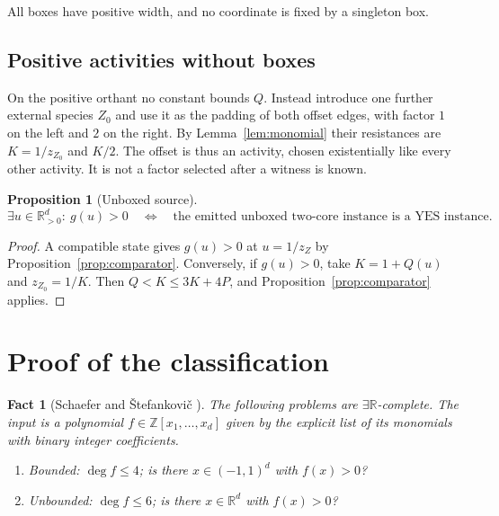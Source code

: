\documentclass[11pt,a4paper]{article}
\theoremstyle{plain}
\newtheorem{proposition}[theorem]{Proposition}
\newtheorem{fact}[theorem]{Fact}
\theoremstyle{definition}
\theoremstyle{remark}
\newcommand{\ER}{\exists\mathbb{R}}
\newcommand{\R}{\mathbb{R}}
\newcommand{\Z}{\mathbb{Z}}
\begin{document}
All boxes have positive width, and no coordinate is fixed by a singleton box.

\subsection{Positive activities without boxes}

On the positive orthant no constant bounds $Q$. Instead introduce one further external species $Z_0$ and use it as the padding of both offset edges, with factor $1$ on the left and $2$ on the right. By Lemma~\ref{lem:monomial} their resistances are $K=1/z_{Z_0}$ and $K/2$. The offset is thus an activity, chosen existentially like every other activity. It is not a factor selected after a witness is known.

\begin{proposition}[Unboxed source]\label{prop:unboxed}
\begin{equation}\label{eq:unboxediff}
 \exists u\in\R^d_{>0}:\ g(u)>0\quad\Longleftrightarrow\quad\text{the emitted unboxed two-core instance is a YES instance.}
\end{equation}
\end{proposition}

\begin{proof}
A compatible state gives $g(u)>0$ at $u=1/z_Z$ by Proposition~\ref{prop:comparator}. Conversely, if $g(u)>0$, take $K=1+Q(u)$ and $z_{Z_0}=1/K$. Then $Q<K\le3K+4P$, and Proposition~\ref{prop:comparator} applies.
\end{proof}

\section{Proof of the classification}\label{sec:complexity}

\begin{fact}[Schaefer and Štefankovič {\citep[Propositions~2.6 and~2.12]{schaefer2024}}]\label{fact:sources}
The following problems are $\ER$-complete. The input is a polynomial $f\in\Z[x_1,\ldots,x_d]$ given by the explicit list of its monomials with binary integer coefficients.
\begin{enumerate}[label=\textup{(\alph*)}]
\item \emph{Bounded:} $\deg f\le4$; is there $x\in(-1,1)^d$ with $f(x)>0$?
\item \emph{Unbounded:} $\deg f\le6$; is there $x\in\R^d$ with $f(x)>0$?
\end{enumerate}
\end{fact}
\end{document}
